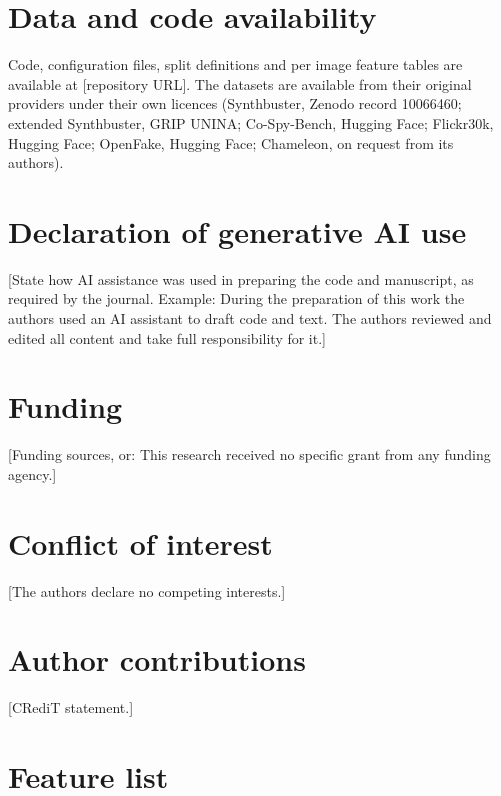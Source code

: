 \documentclass[11pt,a4paper]{article}
\begin{document}
\section*{Data and code availability}
Code, configuration files, split definitions and per image feature tables are available at [repository URL]. The datasets are available from their original providers under their own licences (Synthbuster, Zenodo record 10066460; extended Synthbuster, GRIP UNINA; Co-Spy-Bench, Hugging Face; Flickr30k, Hugging Face; OpenFake, Hugging Face; Chameleon, on request from its authors).

\section*{Declaration of generative AI use}
[State how AI assistance was used in preparing the code and manuscript, as required by the journal. Example: During the preparation of this work the authors used an AI assistant to draft code and text. The authors reviewed and edited all content and take full responsibility for it.]

\section*{Funding}
[Funding sources, or: This research received no specific grant from any funding agency.]

\section*{Conflict of interest}
[The authors declare no competing interests.]

\section*{Author contributions}
[CRediT statement.]




\appendix
\section{Feature list}
\label{app:features}
\end{document}
